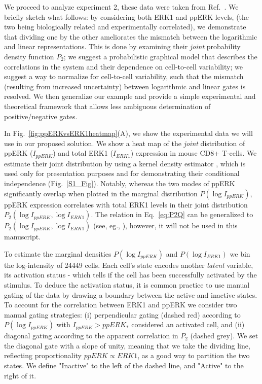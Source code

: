 \documentclass[11pt,a4paper,final]{article}
\begin{document}
\smallskip
We proceed to analyze experiment 2, these data were taken from Ref.~\cite{Feinerman2008}. We briefly sketch what follows: by considering both ERK1 and ppERK levels, (the two being biologically related and experimentally correlated), we demonstrate that dividing one by the other ameliorates the mismatch between the logarithmic and linear representations. This is done by examining their \emph{joint} probability density function $P_2$; we suggest a probabilistic graphical model that describes the correlations in the system and their dependence on cell-to-cell variability; we suggest a way to normalize for cell-to-cell variability, such that the mismatch (resulting from increased uncertainty) between logarithmic and linear gates is resolved. We then generalize our example and provide a simple experimental and theoretical framework that allows less ambiguous determination of positive/negative gates. 

\smallskip
In Fig.~\ref{fig:ppERKvsERK1heatmap}(A), we show the experimental data we will use in our proposed solution. We show a heat map of the \emph{joint} distribution of ppERK ($I_{ppERK}$) and total ERK1 ($I_{ERK1}$) expression in mouse CD8+ T-cells. We estimate their joint distribution by using a kernel density estimator \cite{botev2010}, which is used only for presentation purposes and for demonstrating their conditional independence (Fig.~\ref{S1_Fig}).
Notably, whereas the two modes of ppERK significantly overlap when plotted in the marginal distribution $P(\log I_{ppERK})$, ppERK expression correlates with total ERK1 levels in their joint distribution $P_2(\log I_{ppERK},\log I_{ERK1})$. The relation in Eq.~\ref{eq:P2Q} can be generalized to $P_2(\log I_{ppERK},\log I_{ERK1})$ (see, eg., \cite{Mukhopadhyay2000}), however, it will not be used in this manuscript.

\smallskip
To estimate the marginal densities $P(\log I_{ppERK})$ and $P(\log I_{ERK1})$ we bin the log-intensity of 24449 cells.  Each cell's state encodes another \emph{latent} variable, its activation status - which tells if the cell has been successfully activated by the stimulus. To deduce the activation status, it is common practice to use manual gating of the data by drawing a boundary between the active and inactive states. To account for the correlation between ERK1 and ppERK we consider two manual gating strategies: (i) perpendicular gating (dashed red) according to $P(\log I_{ppERK})$ with $I_{ppERK}>ppERK_*$ considered an activated cell, and (ii) diagonal gating according to the apparent correlation in $P_2$ (dashed grey). We set the diagonal gate with a slope of unity, meaning that we take the dividing line, reflecting  proportionality $ppERK\propto ERK1$, as a good way to partition the two states. We define "Inactive" to the left of the dashed line, and "Active" to the right of it.
\smallskip
\end{document}
